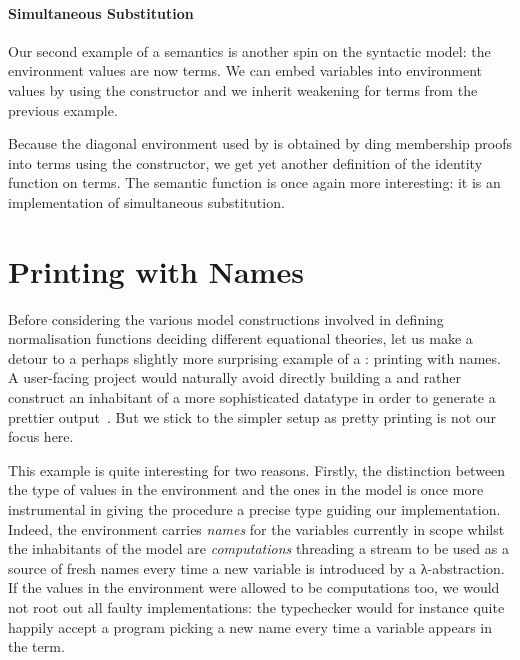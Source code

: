
\paragraph{Simultaneous Substitution}
Our second example of a semantics is another spin on the syntactic model:
the environment values are now terms. We can embed variables into environment
values by using the  constructor and we inherit weakening for terms
from the previous example.


Because the diagonal environment used by  
is obtained by ding membership proofs into terms using the
 constructor, we get yet another definition of the identity
function on terms. The semantic function  
is once again more interesting: it is an implementation of simultaneous
substitution.


\section{Printing with Names}
\label{prettyprint}

Before considering the various model constructions involved in defining
normalisation functions deciding different equational theories, let us
make a detour to a perhaps slightly more surprising example of a
: printing with names. A user-facing project would naturally
avoid directly building a  and rather construct an inhabitant of
a more sophisticated datatype in order to generate a prettier output~\cite{hughes1995design,wadler2003prettier}.
But we stick to the simpler setup as pretty printing is not our focus here.


This example is quite interesting for two reasons. Firstly, the distinction
between the type of values in the environment and the ones in the model is
once more instrumental in giving the procedure a precise type guiding our
implementation. Indeed, the environment carries \emph{names} for the variables
currently in scope whilst the inhabitants of the model are \emph{computations}
threading a stream to be used as a source of fresh names every time a new variable
is introduced by a λ-abstraction. If the values in the environment were allowed
to be computations too, we would not root out all faulty implementations: the
typechecker would for instance quite happily accept a program picking a new
name every time a variable appears in the term.

